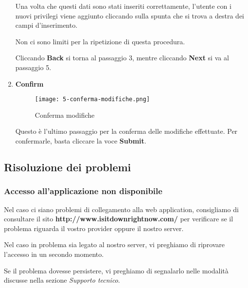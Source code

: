 \documentclass[../manuale-utente.tex]{subfiles}
\begin{document}
\begin{enumerate}
    Una volta che questi dati sono stati inseriti correttamente, l'utente con i nuovi privilegi viene aggiunto cliccando sulla spunta che si trova a destra dei campi d'inserimento.

    Non ci sono limiti per la ripetizione di questa procedura.

    Cliccando \textbf{Back} si torna al passaggio 3, mentre cliccando \textbf{Next} si va al passaggio 5.

    \newpage
    \item \textbf{Confirm}

    \begin{figure}[H]
        \centering
        \texttt{[image: 5-conferma-modifiche.png]}
        \caption{Conferma modifiche}%
        \label{fig:web_app_conferma_modifiche}
    \end{figure}

    Questo è l'ultimo passaggio per la conferma delle modifiche effettuate. Per confermarle, basta cliccare la voce \textbf{Submit}.

\end{enumerate}
\newpage


\subsection{Risoluzione dei problemi}%
\label{subs:web_app_risoluzione_problemi}

\subsubsection{Accesso all'applicazione non disponibile}%
\label{subs:web_app_accesso_non_disponibile}

Nel caso ci siano problemi di collegamento alla web application, consigliamo di consultare il sito \textbf{http://www.isitdownrightnow.com/} per verificare se il problema riguarda il vostro provider oppure il nostro server.

Nel caso in problema sia legato al nostro server, vi preghiamo di riprovare l’accesso in un secondo momento.

Se il problema dovesse persistere, vi preghiamo di segnalarlo nelle modalità discusse nella sezione \textit{Supporto tecnico}.
\end{document}
